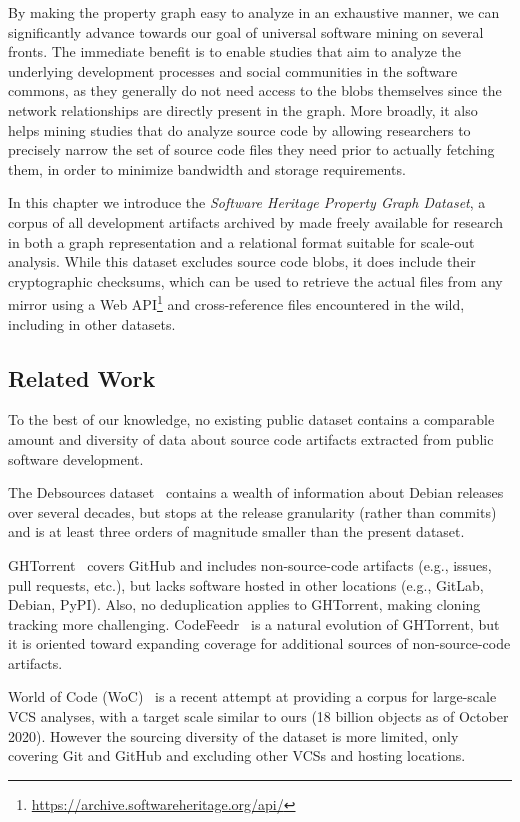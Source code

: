 By making the property graph easy to analyze in an exhaustive manner, we can
significantly advance towards our goal of universal software mining on several
fronts. The immediate benefit is to enable studies that aim to analyze the
underlying development processes and social communities in the software
commons, as they generally do not need access to the blobs themselves since the
network relationships are directly present in the graph. More broadly, it also
helps mining studies that do analyze source code by allowing researchers to
precisely narrow the set of source code files they need prior to actually
fetching them, in order to minimize bandwidth and storage requirements.

In this chapter we introduce the \emph{Software Heritage Property Graph
Dataset}, a corpus of all development artifacts archived by \SWH{} made freely
available for research in both a graph representation and a relational format
suitable for scale-out analysis.
While this dataset excludes source code blobs, it does include their
cryptographic checksums, which can be used to retrieve the actual files from
any \SWH{} mirror using a Web
API\footnote{\url{https://archive.softwareheritage.org/api/}} and
cross-reference files encountered in the wild, including in other datasets.

\subsection{Related Work}

To the best of our knowledge, no existing public dataset contains a comparable
amount and diversity of data about source code artifacts extracted from public
software development.

The Debsources dataset~\cite{debsources-ese-2016} contains a wealth of
information about Debian releases over several decades, but stops at the
release granularity (rather than commits) and is at least three orders of
magnitude smaller than the present dataset.

GHTorrent~\cite{GHTorrent} covers GitHub and includes
non-source-code artifacts (e.g., issues, pull requests, etc.), but lacks
software hosted in other locations (e.g., GitLab, Debian, PyPI). Also, no
deduplication applies to GHTorrent, making cloning tracking more challenging.
CodeFeedr~\cite{DBLP:conf/icse/VargasHKBG18} is a natural evolution of
GHTorrent, but it is oriented toward expanding coverage for additional sources
of non-source-code artifacts.

World of Code (WoC)~\cite{mockus2019woc} is a recent attempt at providing a
corpus for large-scale VCS analyses, with a target scale similar to ours (18
billion objects as of October 2020). However the sourcing diversity of the
dataset is more limited, only covering Git and GitHub and excluding other
\glspl{VCS} and hosting locations.

